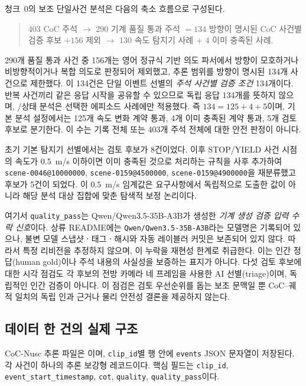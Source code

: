 청크~0의 보조 단일사건 분석은 다음의 축소 흐름으로 구성된다.
\begin{quote}
\small
403 CoC 주석 $\rightarrow$ 290 기계 품질 통과 주석 $=134$ 방향이 명시된 CoC 사건별 검증 후보 $+156$ 제외 $\rightarrow$ 130 속도 탐지기 사례 $+$ 4 이미 충족된 사례.
\end{quote}
290개 품질 통과 사건 중 156개는 영어 정규식 기반 의도 파서에서 방향이 모호하거나 비방향적이거나 복합 의도로 판정되어 제외했고, 추론 범위를 방향이 명시된 134개 사건으로 제한했다. 이 134건은 단일 이벤트 선별의 \emph{주석 사건별 검증 조건} 134개이다. 반복 사건끼리 같은 응답 시작을 공유할 수 있으므로 독립 응답 134개를 뜻하지 않으며, \preserve/\reset 상태 분석은 선택한 에피소드 사례에만 적용했다. 즉 $134=125+4+5$이며, 기본 분석 설정에서는 125개 속도 변화 계약 통과, 4개 이미 충족된 계약 통과, 5개 검토 후보로 분기한다. 이 수는 기록 전체 또는 403개 주석 전체에 대한 안전 판정이 아니다.

초기 기본 탐지기 선별에서는 검토 후보가 8건이었다. 이후 STOP/YIELD 사건 시점의 속도가 $0.5$~m/s 이하이면 이미 충족된 것으로 처리하는 규칙을 사후 추가하여 \texttt{scene-0046@10000000}, \texttt{scene-0159@4500000}, \texttt{scene-0159@4900000}을 재분류했고 후보가 5건이 되었다. 이 $0.5$~m/s 임계값은 요구사항에서 독립적으로 도출한 값이 아니라 해당 분석 대상 집합에 맞춘 탐색적 보정 논리이다.

여기서 \texttt{quality\_pass}는 Qwen/Qwen3.5-35B-A3B가 생성한 \emph{기계 생성 검증 입력 수락 신호}이다. 상류 README에는 \texttt{Qwen/Qwen3.5-35B-A3B}라는 모델명은 기록되어 있으나, 불변 모델 스냅샷ㆍ태그ㆍ해시와 자동 레이블러 커밋은 보존되어 있지 않다. 따라서 특정 리비전을 추정하지 않으며, 이 누락을 재현성 한계로 취급한다. 이는 인간 정답(human gold)이나 주석 내용의 사실성을 보증하는 표지가 아니다. 다섯 검토 후보에 대한 시각 점검도 각 후보의 전방 카메라 네 프레임을 사용한 AI 선별(triage)이며, 독립적인 인간 검증이 아니다. 이 점검은 검토 우선순위를 돕는 보조 문맥일 뿐 CoC--궤적 일치의 독립 인과 근거나 물리 안전성 결론을 제공하지 않는다.

\subsection{데이터 한 건의 실제 구조}
CoC-Nusc 추론 파일은 이며, \texttt{clip\_id}별 행 안에 \texttt{events} JSON 문자열이 저장된다. 각 사건이 하나의 추론 보강형 레코드이다. 핵심 필드는 \texttt{clip\_id}, \texttt{event\_start\_timestamp}, \texttt{cot}, \texttt{quality}, \texttt{quality\_pass}이다.

